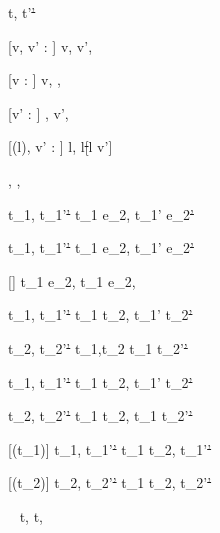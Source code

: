 




  {t,\Sigma {} t'\st{'}}


[v, v' : \beta]
  { }
  {\Edit v,\Sigma {} \Edit v',\Sigma}

[v : \beta]
  { }
  {\Edit v,\Sigma \handle{\Empty} \Enter \beta,\Sigma}

[v' : \beta]
  { }
  {\Enter \beta,\Sigma {} \Edit v',\Sigma}

[\Sigma(l), v' : \beta]
  { }
  {\Update l,\Sigma {} \Update l\st[l \mapsto v']{}}


  { }
  {\Fail,\Sigma {} \Fail,\Sigma}


  {t_1,\Sigma {} t_1'\st{'}}
  {t_1 \Then e_2,\Sigma {} t_1' \Then e_2\st{'}}

  {t_1,\Sigma {} t_1'\st{'}}
  {t_1 \Next e_2,\Sigma {} t_1' \Next e_2\st{'}}

[\neq \bot \wedge \neg{}]
  { }
  {t_1 \Next e_2,\Sigma \handle{\Continue} t_1 \Then e_2,\Sigma}


  {t_1,\Sigma {} t_1'\st{'} }
  {t_1 \And t_2,\Sigma {} t_1' \And t_2\st{'}}

  {t_2,\Sigma {} t_2'\st{'} }
  {t_1,\Sigma \And t_2  t_1 \And t_2'\st{'}}


  {t_1,\Sigma {} t_1'\st{'} }
  {t_1 \Or t_2,\Sigma {} t_1' \Or t_2\st{'}}

  {t_2,\Sigma {} t_2'\st{'} }
  {t_1 \Or t_2,\Sigma {} t_1 \Or t_2'\st{'}}


[\Failing(t_1)]
  {t_1,\Sigma {} t_1'\st{'}}
  {t_1 \Xor t_2,\Sigma {} t_1'\st{'}}

[\Failing(t_2)]
  {t_2,\Sigma {} t_2'\st{'}}
  {t_1 \Xor t_2,\Sigma {} t_2'\st{'}}

  {\ }
  {t,\Sigma \handle{\Pick \Here} t,\Sigma}



